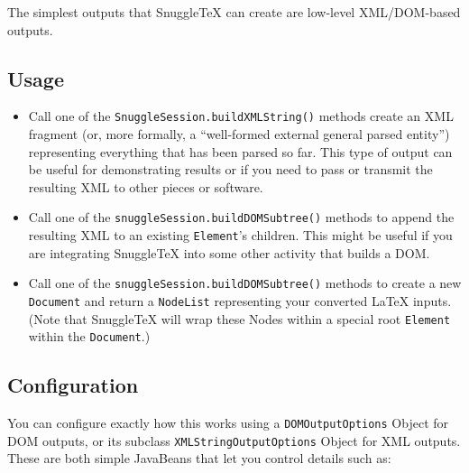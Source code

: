 
The simplest outputs that SnuggleTeX can create are low-level XML/DOM-based outputs.

\subsection*{Usage}

\begin{itemize}
  \item
    Call one of the \verb|SnuggleSession.buildXMLString()| methods create an XML fragment
    (or, more formally, a ``well-formed external general parsed entity'')
    representing everything that has been parsed so far.
    This type of output can be useful for demonstrating results or if you need to pass or
    transmit the resulting XML to other pieces or software.

  \item
    Call one of the \verb|snuggleSession.buildDOMSubtree()|
    methods to append the resulting XML to an existing \verb|Element|'s
    children.  This might be useful if you are integrating SnuggleTeX into some
    other activity that builds a DOM.

  \item
    Call one of the \verb|snuggleSession.buildDOMSubtree()|
    methods to create a new \verb|Document| and return a \verb|NodeList|
    representing your converted LaTeX inputs. (Note that SnuggleTeX will wrap
    these Nodes within a special root \verb|Element| within the
    \verb|Document|.)

\end{itemize}

\subsection*{Configuration}

You can configure exactly how this works using a \verb|DOMOutputOptions| Object
for DOM outputs, or its subclass \verb|XMLStringOutputOptions| Object for XML
outputs. These are both simple JavaBeans that let you control details such as:

